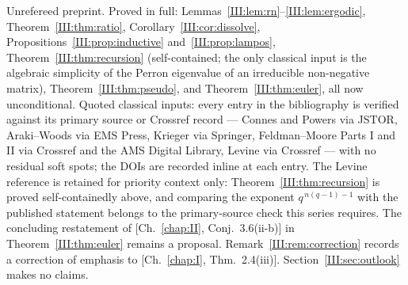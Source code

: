 Unrefereed preprint. Proved in full: Lemmas~\ref{III:lem:rn}--\ref{III:lem:ergodic},
Theorem~\ref{III:thm:ratio}, Corollary~\ref{III:cor:dissolve},
Propositions~\ref{III:prop:inductive} and~\ref{III:prop:lampos},
Theorem~\ref{III:thm:recursion} (self-contained; the only classical input is the
algebraic simplicity of the Perron eigenvalue of an irreducible non-negative matrix),
Theorem~\ref{III:thm:pseudo}, and Theorem~\ref{III:thm:euler}, all now unconditional.
Quoted classical inputs: every entry in the bibliography is verified against its
primary source or Crossref record --- Connes and Powers via JSTOR, Araki--Woods via
EMS Press, Krieger via Springer, Feldman--Moore Parts I and II via Crossref and the
AMS Digital Library, Levine via Crossref --- with no residual soft spots; the DOIs
are recorded inline at each entry. The Levine reference
\cite{LevineIII} is retained for priority context only: Theorem~\ref{III:thm:recursion} is
proved self-containedly above, and comparing the exponent $q^{\,n(q-1)-1}$ with the
published statement belongs to the primary-source check this series requires. The concluding restatement of [Ch.~\ref{chap:II}, Conj.~3.6(ii-b)] in
Theorem~\ref{III:thm:euler} remains a proposal.
Remark~\ref{III:rem:correction} records a correction of emphasis to [Ch.~\ref{chap:I}, Thm.~2.4(iii)].
Section~\ref{III:sec:outlook} makes no claims.
